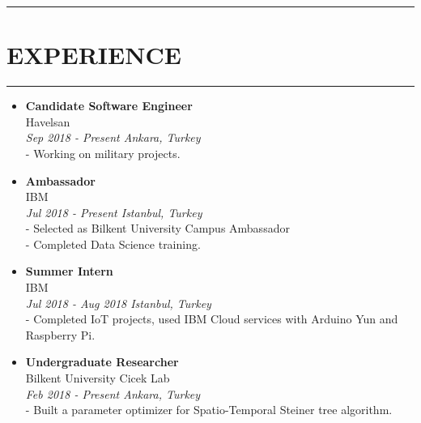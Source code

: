 \documentclass[11 pt, a4paper, usenames, dvipsnames]{article}
\newcommand*{\RoleFont}{%
      \fontsize{14}{8}%
\color{Black}%
\bf
      \selectfont}
\newcommand*{\DateFont}{%
      \fontsize{9.5}{8}%
\color{Gray}%
\it
      \selectfont}
\newcommand*{\SectionFont}{%
      \fontsize{16}{5}%
\color{BrickRed}%
\bf
      \selectfont}
\begin{document}
\setlength{\columnsep}{3em}
\begin{paracol}{2} 

\par\noindent\rule{0.22\textwidth}{0.4pt}\vspace{-12pt}
\section*{\SectionFont\faCubes\enskip  EXPERIENCE}\vspace{-15pt}
\par\noindent\rule{0.22\textwidth}{0.4pt}
\begin{itemize}[leftmargin=0pt,align=left,labelwidth=\parindent,labelsep=0pt]
\item[] {\RoleFont Candidate Software Engineer} \\
\normalfont Havelsan \\ 
{\DateFont Sep 2018 - Present   \hfill Ankara, Turkey } \\ 
{\color{BrickRed}\LARGE - }{Working on military projects.}

\item[] {\RoleFont Ambassador} \\
\normalfont IBM \\ 
{\DateFont Jul 2018 - Present \hfill Istanbul, Turkey } \\
{\color{BrickRed}\LARGE - }{ Selected as Bilkent University Campus Ambassador} \\
{\color{BrickRed}\LARGE - }{ Completed Data Science training.}

\item[] {\RoleFont Summer Intern} \\
\normalfont IBM \\ 
{\DateFont Jul 2018 - Aug 2018 \hfill Istanbul, Turkey } \\
{\color{BrickRed}\LARGE - }{ Completed IoT projects, used IBM Cloud services with Arduino Yun and Raspberry Pi.}

\item[] {\RoleFont Undergraduate Researcher} \\
\normalfont Bilkent University Cicek Lab \\ 
{\DateFont Feb 2018 - Present \hfill Ankara, Turkey } \\
{\color{BrickRed}\LARGE - }{Built a parameter optimizer for Spatio-Temporal Steiner tree algorithm.}
\end{itemize}


\end{paracol}
\end{document}
